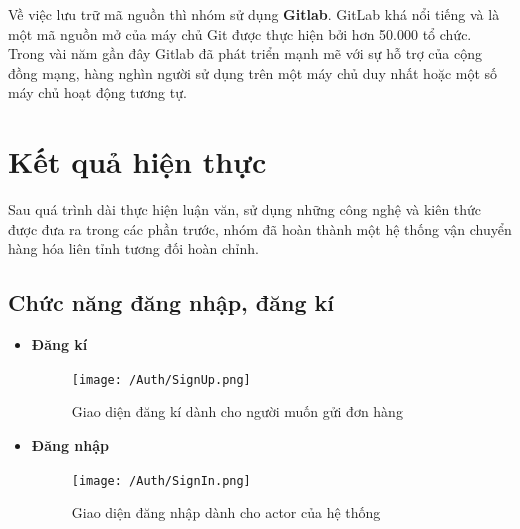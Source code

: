 	Về việc lưu trữ mã nguồn thì nhóm sử dụng \textbf{Gitlab}. GitLab khá nổi tiếng và là một mã nguồn mở của máy chủ Git được thực hiện bởi hơn 50.000 tổ chức. Trong vài năm gần đây Gitlab đã phát triển mạnh mẽ với sự hỗ trợ của cộng đồng mạng, hàng nghìn người sử dụng trên một máy chủ duy nhất hoặc một số máy chủ hoạt động tương tự.
	




\section{Kết quả hiện thực}

Sau quá trình dài thực hiện luận văn, sử dụng những công nghệ và kiên thức được đưa
ra trong các phần trước, nhóm đã hoàn thành một hệ thống vận chuyển hàng hóa liên tỉnh tương đối hoàn chỉnh.

\subsection{Chức năng đăng nhập, đăng kí}

	\begin{itemize}
		\item \textbf{Đăng kí}
			\begin{figure}[H]
				\texttt{[image: /Auth/SignUp.png]}
				\centering
				\caption{Giao diện đăng kí dành cho người muốn gửi đơn hàng}
			\end{figure}
		
		\item \textbf{Đăng nhập}
		\begin{figure}[H]
			\texttt{[image: /Auth/SignIn.png]}
			\centering
			\caption{Giao diện đăng nhập dành cho actor của hệ thống}
		\end{figure}
	\end{itemize}


